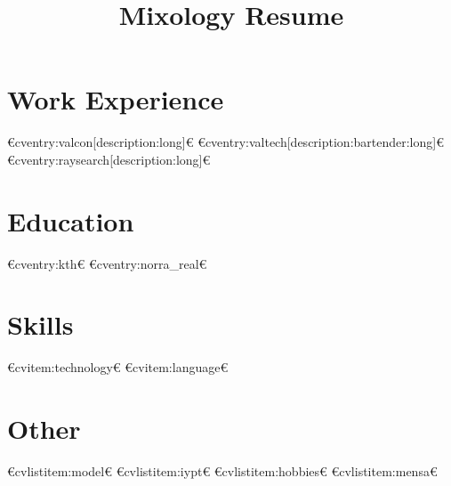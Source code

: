 
\title{Mixology Resume}



\newcommand{\role}{Bartender}
\newcommand{\company}{DFDS}



  \makecvtitle

  \section{Work Experience}
  €cventry:valcon[description:long]€
  €cventry:valtech[description:bartender:long]€
  €cventry:raysearch[description:long]€

  \section{Education}
  €cventry:kth€
  €cventry:norra_real€

  \section{Skills}
  €cvitem:technology€
  €cvitem:language€

  \section{Other}
  €cvlistitem:model€
  €cvlistitem:iypt€
  €cvlistitem:hobbies€
  €cvlistitem:mensa€

  
